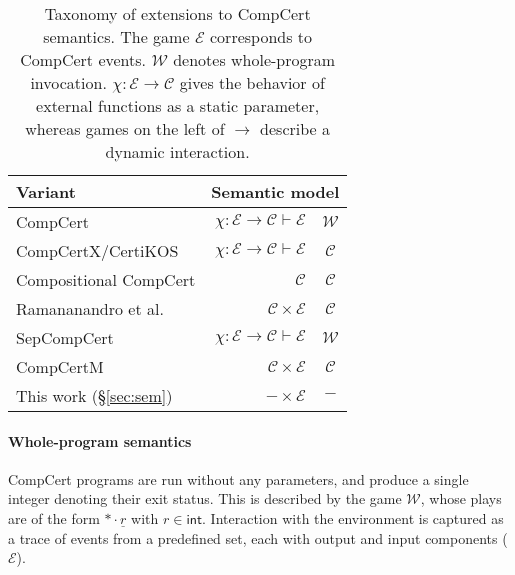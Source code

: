 \documentclass[sigplan,10pt,review,anonymous]{acmart}
\newcommand{\kw}[1]{\ensuremath{ \mathsf{#1} }}
\begin{document}
\begin{table} %
  \begin{tabular}{lr@{${}\rightarrow{}$}c}
    \hline
    Variant & \multicolumn{2}{r}{Semantic model} \\
    \hline
    CompCert \cite{compcert} &
      $\chi : \mathcal{E} \rightarrow \mathcal{C} \vdash \mathcal{E}$ &
      $\mathcal{W}$ \\
    CompCertX/CertiKOS \cite{popl15} &
      $\chi : \mathcal{E} \rightarrow \mathcal{C} \vdash \mathcal{E}$ &
      $\mathcal{C}$ \\
    Compositional CompCert \cite{compcompcert} &
      $\mathcal{C}$ & $\mathcal{C}$ \\
    Ramananandro et al. \cite{cpp15} &
      $\mathcal{C} \times \mathcal{E}$ & $\mathcal{C}$ \\
    SepCompCert \cite{sepcompcert} &
      $\chi : \mathcal{E} \rightarrow \mathcal{C} \vdash \mathcal{E}$ &
      $\mathcal{W}$ \\
    CompCertM \cite{compcertm} &
      $\mathcal{C} \times \mathcal{E}$ & $\mathcal{C}$ \\
    This work (\S\ref{sec:sem}) &
      $- \times \mathcal{E}$ & $-$ \\
    \hline
  \end{tabular}
  \vspace{1ex}
  \caption{Taxonomy of extensions to CompCert semantics.
    The game $\mathcal{E}$ corresponds to CompCert events.
    $\mathcal{W}$ denotes whole-program invocation.
    $\chi : \mathcal{E} \rightarrow \mathcal{C}$
    gives the behavior of external functions
    as a static parameter,
    whereas games on the left of $\rightarrow$
    describe a dynamic interaction.
  }
  \label{tbl:compcerts}
\end{table}

\paragraph{Whole-program semantics} %

CompCert programs are run without any parameters,
and produce a single integer denoting their exit status.
This is described by the game $\mathcal{W}$,
whose plays are of the form ${*} \cdot \underline{r}$
with $r \in \kw{int}$.
Interaction with the environment
is captured as a trace of events from a predefined set,
each with output and input components ($\mathcal{E}$).
\end{document}
